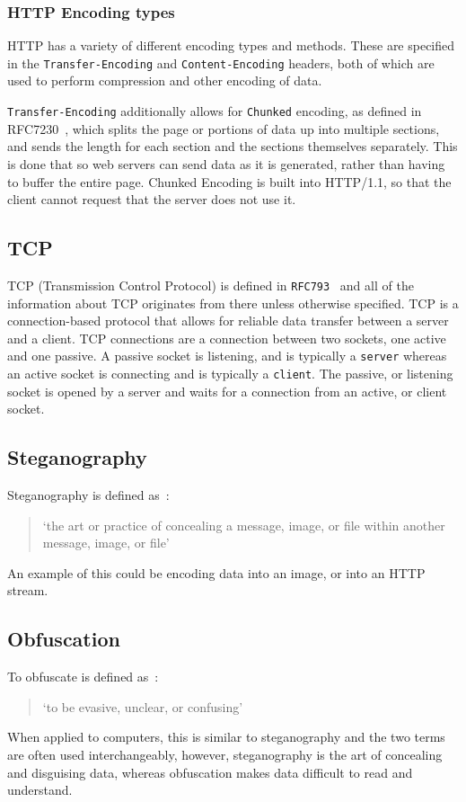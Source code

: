 \subsubsection{HTTP Encoding types}
HTTP has a variety of different encoding types and methods.
These are specified in the \texttt{Transfer-Encoding} and \texttt{Content-Encoding} headers, both of which are  used to perform compression and other encoding of data.\par
\texttt{Transfer-Encoding} additionally allows for \texttt{Chunked} encoding, as defined in\\ RFC7230~\cite{rfc7230}, which splits the page or portions of data up into multiple sections, and sends the length for each section and the sections themselves separately. This is done that so web servers can send data as it is generated, rather than having to buffer the entire page. Chunked Encoding is built into HTTP/1.1, so that the client cannot request that the server does not use it.

\subsection{TCP}
TCP (Transmission Control Protocol) is defined in \texttt{RFC793}~\cite{rfc793} and all of the information about TCP originates from there unless otherwise specified.
TCP is a connection-based protocol that allows for reliable data transfer between a server and a client.
TCP connections are a connection between two sockets, one active and one passive.
A passive socket is listening, and is typically a \texttt{server} whereas an active socket is connecting and is typically a \texttt{client}.
The passive, or listening socket is opened by a server and waits for a connection from an active, or client socket.

\subsection{Steganography}
Steganography is defined as~\cite{dictsteno}:
\begin{quotation}
    `the art or practice of concealing a message, image, or file within
    another message, image, or file'
\end{quotation}
An example of this could be encoding data into an image, or into an HTTP stream.

\subsection{Obfuscation}
To obfuscate is defined as~\cite{dictobfs}:
\begin{quotation}
     `to be evasive, unclear, or confusing'
\end{quotation}
When applied to computers, this is similar to steganography and the two terms are often used interchangeably, however, steganography is the art of concealing and disguising data, whereas obfuscation makes data difficult to read and understand. 

